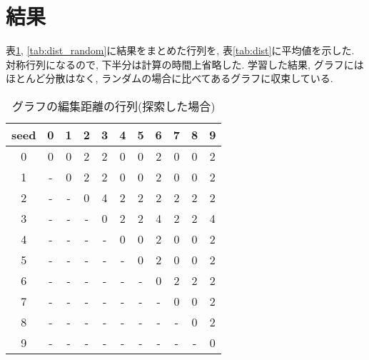 \documentclass[twocolumn]{jarticle}     %
\begin{document}
\section{結果}
%

表\ref{tab:dist_forward}, \ref{tab:dist_random}に結果をまとめた行列を, 表\ref{tab:dist}に平均値を示した.
対称行列になるので, 下半分は計算の時間上省略した.
学習した結果, グラフにはほとんど分散はなく, ランダムの場合に比べてあるグラフに収束している.

\begin{table}[tb]
  \begin{center}
    \caption{グラフの編集距離の行列(探索した場合)}
    \begin{tabular}{|c||c|c|c|c|c|c|c|c|c|c|} \hline
      seed & 0 & 1 & 2 & 3 & 4 & 5 & 6 & 7 & 8 & 9 \\ \hline \hline
      0 & 0 & 0 & 2 & 2 & 0 & 0 & 2 & 0 & 0 & 2 \\ \hline
      1 & - & 0 & 2 & 2 & 0 & 0 & 2 & 0 & 0 & 2 \\ \hline
      2 & - & - & 0 & 4 & 2 & 2 & 2 & 2 & 2 & 2 \\ \hline
      3 & - & - & - & 0 & 2 & 2 & 4 & 2 & 2 & 4 \\ \hline
      4 & - & - & - & - & 0 & 0 & 2 & 0 & 0 & 2 \\ \hline
      5 & - & - & - & - & - & 0 & 2 & 0 & 0 & 2 \\ \hline
      6 & - & - & - & - & - & - & 0 & 2 & 2 & 2 \\ \hline
      7 & - & - & - & - & - & - & - & 0 & 0 & 2 \\ \hline
      8 & - & - & - & - & - & - & - & - & 0 & 2 \\ \hline
      9 & - & - & - & - & - & - & - & - & - & 0 \\ \hline
    \end{tabular}
    \label{tab:dist_forward}
  \end{center}
\end{table}
\end{document}
